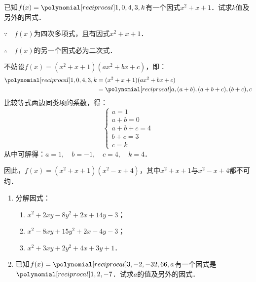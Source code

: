 \begin{example}
    已知$f(x)=\poly{1,0,4,3,k}$有一个因式$x^2+x+1$．试求$k$值及另外的因式．
\end{example}

\begin{solution}
    $\because\quad f(x)$为四次多项式，且有因式$x^2+x+1$．

    $\therefore\quad f(x)$的另一个因式必为二次式．

    不妨设$f(x)=(x^2+x+1)(ax^2+bx+c)$，即：
\[\begin{split}
    \poly{1,0,4,3,k}&=(x^2+x+1)(ax^2+bx+c)\\
    &=\poly{a,(a+b),(a+b+c),(b+c),c}
\end{split}\]
比较等式两边同类项的系数，得：
\[\begin{cases}
    a=1\\
    a+b=0\\
    a+b+c=4\\
    b+c=3\\
    c=k
\end{cases}\]
从中可解得：$a=1,\quad b=-1,\quad c=4,\quad k=4$．

因此，$f(x)=(x^2+x+1)(x^2-x+4)$，其中$x^2+x+1$与$x^2-x+4$都不可约．
\end{solution}

\begin{ex}
\begin{enumerate}
    \item 分解因式：
\begin{enumerate}
    \item $x^2+2xy-8y^2+2x+14y-3$；
    \item $x^2-8xy+15y^2+2x-4y-3$；
    \item $x^2+3xy+2y^2+4x+3y+1$．
\end{enumerate}
\item  已知$f(x)=\poly{3,-2,-32,66,a}$有一个因式是$\poly{1,2,-7}$．试求$a$的值及另外的因式．
\end{enumerate}    
\end{ex}

